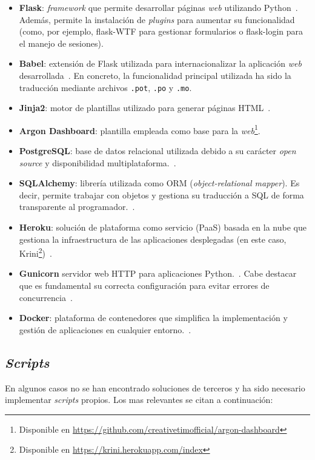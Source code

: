 \begin{itemize}
	\item \textbf{Flask}: \textit{framework} que permite desarrollar páginas \textit{web} utilizando Python~\cite{flask}. Además, permite la instalación de \textit{plugins} para aumentar su funcionalidad (como, por ejemplo, flask-WTF para gestionar formularios o flask-login para el manejo de sesiones). 
	\item \textbf{Babel}: extensión de Flask utilizada para internacionalizar la aplicación \textit{web} desarrollada~\cite{flaskBabel}. En concreto, la funcionalidad principal utilizada ha sido la traducción mediante archivos \texttt{.pot}, \texttt{.po} y \texttt{.mo}.
	\item \textbf{Jinja2}: motor de plantillas utilizado para generar páginas HTML~\cite{jinja}.
	\item \textbf{Argon Dashboard}: plantilla empleada como base para la \textit{web}\footnote{Disponible en \url{https://github.com/creativetimofficial/argon-dashboard}}.
	\item \textbf{PostgreSQL}: base de datos relacional utilizada debido a su carácter \textit{open source} y disponibilidad multiplataforma.~\cite{postgresql}.
	\item \textbf{SQLAlchemy}: librería utilizada como ORM (\textit{object-relational mapper}). Es decir, permite trabajar con objetos y gestiona su traducción a SQL de forma transparente al programador.~\cite{SQLAlchemy}.
	\item \textbf{Heroku}: solución de plataforma como servicio (PaaS) basada en la nube que gestiona la infraestructura de las aplicaciones desplegadas (en este caso, Krini\footnote{Disponible en \url{https://krini.herokuapp.com/index}})~\cite{heroku}.
	\item \textbf{Gunicorn} servidor web HTTP para aplicaciones Python.~\cite{gunicorn}. Cabe destacar que es fundamental su correcta configuración para evitar errores de concurrencia~\cite{herokuPreload}.
	\item \textbf{Docker}: plataforma de contenedores que simplifica la implementación y gestión de aplicaciones en cualquier entorno.~\cite{docker}.
\end{itemize}

\subsection{\textit{Scripts}} 

En algunos casos no se han encontrado soluciones de terceros y ha sido necesario implementar \textit{scripts} propios. Los mas relevantes se citan a continuación:

